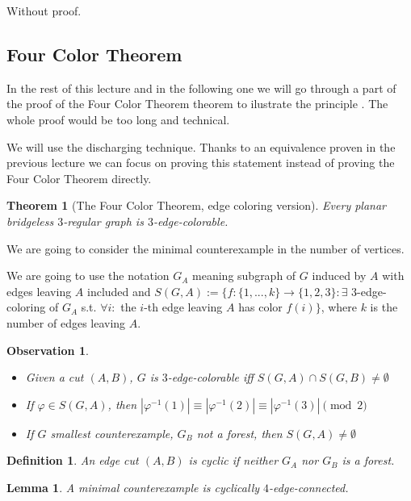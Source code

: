 \documentclass{article}
\newtheorem*{theorem}{Theorem}
\newtheorem*{definition}{Definition}
\newtheorem*{lemma}{Lemma}
\newtheorem*{observation}{Observation}
\begin{document}
\noindent
Without proof.


\subsection*{Four Color Theorem}
In the rest of this lecture and in the following one we will go through a part
of the proof of the Four Color Theorem theorem to ilustrate the principle . The
whole proof would be too long and technical.

We will use the discharging technique. Thanks to an equivalence proven in the
previous lecture we can focus on proving this statement instead of proving the
Four Color Theorem directly.

\begin{theorem}[The Four Color Theorem, edge coloring version]
	Every planar bridgeless $3$-regular graph is $3$-edge-colorable.
\end{theorem}

\noindent
We are going to consider the minimal counterexample in the number of vertices.

We are going to use the notation $G_A$ meaning subgraph of $G$ induced by $A$
with edges leaving $A$ included and $S(G, A) := \{ f: \{1,...,k\} \rightarrow
\{1,2,3\}: \exists$ $3$-edge-coloring of $G_A$ s.t. $\forall i:$ the $i$-th
edge leaving $A$ has color $f(i) \}$, where $k$ is the number of edges leaving
$A$.

\begin{observation}
	~
	\begin{itemize}
		\item Given a cut $(A,B)$, $G$ is $3$-edge-colorable iff
			$S(G,A) \cap S(G,B) \neq \emptyset$
		\item If $\varphi \in S(G,A)$, then
			$|\varphi^{-1}(1)| \equiv |\varphi^{-1}(2)|
			\equiv |\varphi^{-1}(3)| \pmod{2}$
		\item If $G$ smallest counterexample, $G_B$ not a forest, then
			$S(G,A) \neq \emptyset$
	\end{itemize}
\end{observation}

\begin{definition}
	An edge cut $(A, B)$ is \emph{cyclic} if neither $G_A$ nor $G_B$ is a
	forest.
\end{definition}

\begin{lemma}
	A minimal counterexample is cyclically $4$-edge-connected.
\end{lemma}
\end{document}

